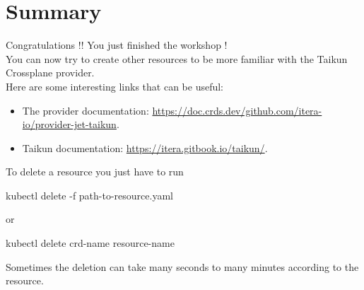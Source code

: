 \section{Summary}\label{sec:resume}

Congratulations !! You just finished the workshop !\\

You can now try to create other resources to be more familiar with the Taikun Crossplane provider.\\

Here are some interesting links that can be useful:
\begin{itemize}
    \item The provider documentation: \href{https://doc.crds.dev/github.com/itera-io/provider-jet-taikun}{https://doc.crds.dev/github.com/itera-io/provider-jet-taikun}.
    \item Taikun documentation: \href{https://itera.gitbook.io/taikun/}{https://itera.gitbook.io/taikun/}.
\end{itemize}

\begin{note}
To delete a resource you just have to run
\begin{shell}
kubectl delete -f path-to-resource.yaml
\end{shell}
or
\begin{shell}
kubectl delete crd-name resource-name
\end{shell}
Sometimes the deletion can take many seconds to many minutes according to the resource.
\end{note}